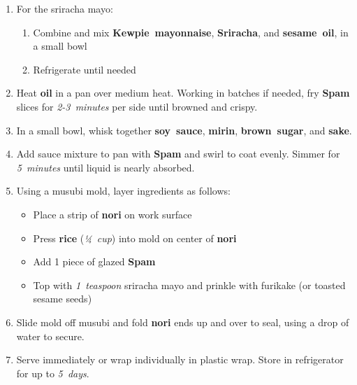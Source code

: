 \documentclass[11pt,letterpaper]{article}
\begin{document}
\begin{enumerate}
    \item For the sriracha mayo:
    \begin{enumerate}
        \item Combine and mix \textbf{Kewpie~mayonnaise}, \textbf{Sriracha}, and \textbf{sesame~oil}, in a small bowl
        \item Refrigerate until needed
    \end{enumerate}
    
    \item Heat \textbf{oil} in a pan over medium heat. Working in batches if needed, fry \textbf{Spam} slices for \textit{2-3~minutes} per side until browned and crispy.
    
    \item In a small bowl, whisk together \textbf{soy~sauce}, \textbf{mirin}, \textbf{brown~sugar}, and \textbf{sake}. 
    
    \item Add sauce mixture to pan with \textbf{Spam} and swirl to coat evenly. Simmer for \textit{5~minutes} until liquid is nearly absorbed.
    
    \item Using a musubi mold, layer ingredients as follows:
    \begin{itemize}
        \item Place a strip of \textbf{nori} on work surface
        \item Press \textbf{rice} (\textit{¼~cup}) into mold on center of \textbf{nori}
        \item Add 1 piece of glazed \textbf{Spam}
        \item Top with \textit{1~teaspoon} sriracha mayo and prinkle with furikake (or toasted sesame seeds)
    \end{itemize}
    
    \item Slide mold off musubi and fold \textbf{nori} ends up and over to seal, using a drop of water to secure.
    
    \item Serve immediately or wrap individually in plastic wrap. Store in refrigerator for up to \textit{5~days}.
\end{enumerate}
\end{document}

